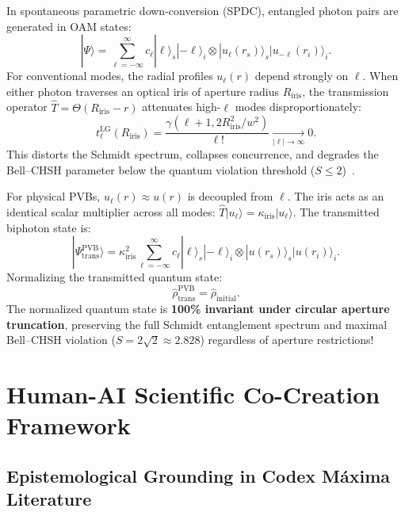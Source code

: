 \documentclass[11pt,a4paper]{article}
\begin{document}
In spontaneous parametric down-conversion (SPDC), entangled photon pairs are generated in OAM states:
\begin{equation}
|\Psi\rangle = \sum_{\ell=-\infty}^\infty c_\ell |\ell\rangle_s |-\ell\rangle_i \otimes |u_\ell(r_s)\rangle_s |u_{-\ell}(r_i)\rangle_i.
\label{eq:spdc_biphoton_state}
\end{equation}
For conventional modes, the radial profiles $u_\ell(r)$ depend strongly on $\ell$. When either photon traverses an optical iris of aperture radius $R_{\text{iris}}$, the transmission operator $\hat{T} = \Theta(R_{\text{iris}} - r)$ attenuates high-$\ell$ modes disproportionately:
\begin{equation}
t_\ell^{\text{LG}}(R_{\text{iris}}) = \frac{\gamma(\ell+1, 2 R_{\text{iris}}^2 / w^2)}{\ell!} \xrightarrow[|\ell| \to \infty]{} 0.
\label{eq:lg_pupil_attenuation}
\end{equation}
This distorts the Schmidt spectrum, collapses concurrence, and degrades the Bell--CHSH parameter below the quantum violation threshold ($S \le 2$)~\cite{Clauser1969,LawEberly2004,Walborn2010}.

For physical PVBs, $u_\ell(r) \approx u(r)$ is decoupled from $\ell$. The iris acts as an identical scalar multiplier across all modes: $\hat{T} |u_\ell\rangle = \kappa_{\text{iris}} |u_\ell\rangle$. The transmitted biphoton state is:
\begin{equation}
|\Psi_{\text{trans}}^{\text{PVB}}\rangle = \kappa_{\text{iris}}^2 \sum_{\ell=-\infty}^\infty c_\ell |\ell\rangle_s |-\ell\rangle_i \otimes |u(r_s)\rangle_s |u(r_i)\rangle_i.
\label{eq:pvb_transmitted_biphoton}
\end{equation}
Normalizing the transmitted quantum state:
\begin{equation}
\boxed{\hat{\rho}_{\text{trans}}^{\text{PVB}} = \hat{\rho}_{\text{initial}}.}
\label{eq:rho_invariance}
\end{equation}
The normalized quantum state is \textbf{100\% invariant under circular aperture truncation}, preserving the full Schmidt entanglement spectrum and maximal Bell--CHSH violation ($S = 2\sqrt{2} \approx 2.828$) regardless of aperture restrictions!

\section{Human-AI Scientific Co-Creation Framework}
\label{sec:co_creation}

\subsection{Epistemological Grounding in Codex Máxima Literature}
\end{document}
